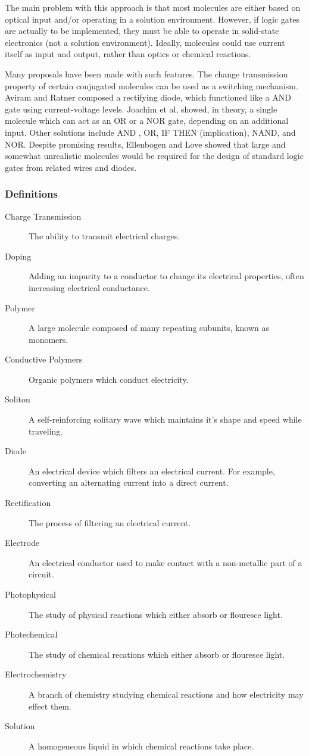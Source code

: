 \documentclass[12pt]{article}
\begin{document}
The main problem with this approach is that most molecules are either based on optical input and/or operating in a solution environment. However, if logic gates are actually to be implemented, they must be able to operate in solid-state electronics (not a solution environment). Ideally, molecules could use current itself as input and output, rather than optics or chemical reactions. 

Many proposals have been made with such features. The change transmission property of certain conjugated molecules can be used as a switching mechanism. Aviram and Ratner composed a rectifying diode, which functioned like a AND gate using current-voltage levels. Joachim et al, showed, in theory, a single molecule which can act as an OR or a NOR gate, depending on an additional input. Other solutions include AND\cite{20} , OR\cite{21}, IF THEN (implication)\cite{22}, NAND\cite{23}, and NOR\cite{24}. Despite promising results, Ellenbogen and Love showed that large and somewhat unrealistic molecules would be required for the design of standard logic gates from related wires and diodes. 

\subsubsection{Definitions} 

\begin{description}
\item[Charge Transmission] The ability to transmit electrical charges.
\item[Doping] Adding an impurity to a conductor to change its electrical properties, often increasing electrical conductance.
\item[Polymer] A large molecule composed of many repeating subunits, known as monomers.
\item[Conductive Polymers] Organic polymers which conduct electricity.
\item[Soliton] A self-reinforcing solitary wave which maintains it's shape and speed while traveling.
\item[Diode] An electrical device which filters an electrical current. For example, converting an alternating current into a direct current.
\item[Rectification] The process of filtering an electrical current.
\item[Electrode] An electrical conductor used to make contact with a non-metallic part of a circuit.
\item[Photophysical] The study of physical reactions which either absorb or flouresce light. 
\item[Photechemical] The study of chemical recations which either absorb or flouresce light.
\item[Electrochemistry] A branch of chemistry studying chemical reactions and how electricity may effect them.
\item[Solution] A homogeneous liquid in which chemical reactions take place.
\end{description}
\end{document}
